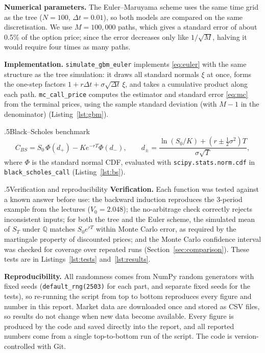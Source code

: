 \documentclass[12pt]{amsart}
\makeatletter
\def\subsection{\@startsection{subsection}{2}{\z@}{.7\linespacing\@plus\linespacing}%
  {.5\linespacing}{\normalfont\bfseries}}
\newcommand{\Q}{\mathbb{Q}}
\makeatother
\begin{document}
\noindent\textbf{Numerical parameters.} The Euler--Maruyama scheme uses the same time grid as
the tree ($N=100$, $\Delta t=0.01$), so both models are compared on the same discretisation.
We use $M=100{,}000$ paths, which gives a standard error of about 0.5\% of the option price;
since the error decreases only like $1/\sqrt M$, halving it would require four times as many paths.

\noindent\textbf{Implementation.} \texttt{simulate\_gbm\_euler} implements \eqref{eq:euler}
with the same structure as the tree simulation: it draws all standard normals $\xi$ at once,
forms the one-step factors $1+r\Delta t+\sigma\sqrt{\Delta t}\,\xi$, and takes a cumulative
product along each path. \texttt{mc\_call\_price} computes the estimator and standard error
\eqref{eq:mc} from the terminal prices, using the sample standard deviation (with $M-1$ in the
denominator) (Listing~\ref{lst:gbm}).

\subsection{Black--Scholes benchmark}\label{sec:bs}
\begin{equation}\label{eq:bs}
C_{BS}=S_0\,\Phi(d_+)-Ke^{-rT}\Phi(d_-),\qquad
d_\pm=\frac{\ln(S_0/K)+(r\pm\tfrac12\sigma^2)T}{\sigma\sqrt T},
\end{equation}
where $\Phi$ is the standard normal CDF, evaluated with \texttt{scipy.stats.norm.cdf} in
\texttt{black\_scholes\_call} (Listing~\ref{lst:bs}).

\subsection{Verification and reproducibility}
\noindent\textbf{Verification.} Each function was tested against a known answer before use:
the backward induction reproduces the 3-period example from the lectures ($V_0=2.048$); the
no-arbitrage check correctly rejects inconsistent inputs; for both the tree and the Euler
scheme, the simulated mean of $S_T$ under $\Q$ matches $S_0e^{rT}$ within Monte Carlo error,
as required by the martingale property of discounted prices; and the Monte Carlo confidence
interval was checked for coverage over repeated runs (Section~\ref{sec:comparison}).
These tests are in Listings~\ref{lst:tests} and~\ref{lst:results}.

\noindent\textbf{Reproducibility.} All randomness comes from NumPy random generators with fixed
seeds (\texttt{default\_rng(2503)} for each part, and separate fixed seeds for the tests), so
re-running the script from top to bottom reproduces every figure and number in this report.
Market data are downloaded once and stored as CSV files, so results do not change when new
data become available. Every figure is produced by the code and saved directly into the report,
and all reported numbers come from a single top-to-bottom run of the script. The code is
version-controlled with Git.
\end{document}
